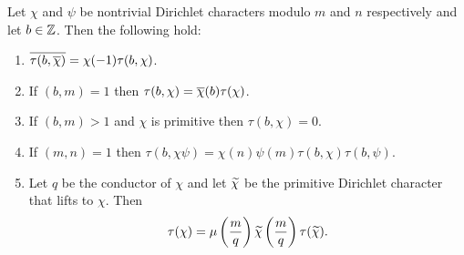       \begin{proposition}\label{prop:Gauss_sum_reduction}
        Let $\chi$ and $\psi$ be nontrivial Dirichlet characters modulo $m$ and $n$ respectively and let $b \in \mathbb{Z}$. Then the following hold:
        \begin{enumerate}[label*=(\roman*)]
          \item $\overline{\tau(b,\overline{\chi})} = \chi(-1)\tau(b,\chi)$.
          \item If $(b,m) = 1$ then $\tau(b,\chi) = \overline{\chi}(b)\tau(\chi)$.
          \item If $(b,m) > 1$ and $\chi$ is primitive then $\tau(b,\chi) = 0$.
          \item If $(m,n) = 1$ then $\tau(b,\chi\psi) = \chi(n)\psi(m)\tau(b,\chi)\tau(b,\psi)$.
          \item Let $q$ be the conductor of $\chi$ and let $\widetilde{\chi}$ be the primitive Dirichlet character that lifts to $\chi$. Then
          \[
            \tau(\chi) = \mu\left(\frac{m}{q}\right)\widetilde{\chi}\left(\frac{m}{q}\right)\tau(\widetilde{\chi}).
          \]
        \end{enumerate}
      \end{proposition}
